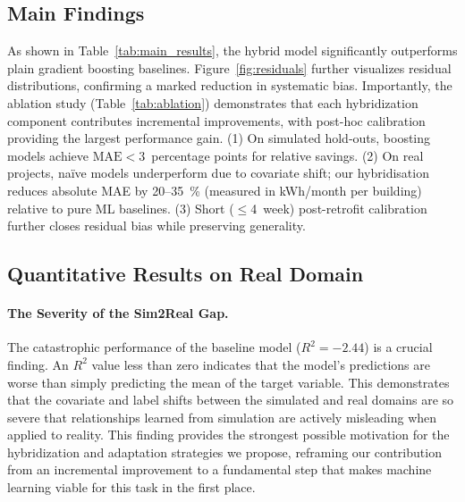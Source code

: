 ﻿\documentclass{article}
\begin{document}
\subsection{Main Findings}
As shown in Table~\ref{tab:main_results}, the hybrid model significantly outperforms 
plain gradient boosting baselines. Figure~\ref{fig:residuals} further visualizes 
residual distributions, confirming a marked reduction in systematic bias. 
Importantly, the ablation study (Table~\ref{tab:ablation}) 
demonstrates that each hybridization component contributes incremental improvements, 
with post-hoc calibration providing the largest performance gain.
(1) On simulated hold‑outs, boosting models achieve $\mathrm{MAE}<3$~percentage points for relative savings.
(2) On real projects, na\"ive models underperform due to covariate shift;
our hybridisation reduces absolute MAE by 20--35~\% (measured in kWh/month per building) relative to pure ML baselines.
(3) Short (\mbox{$\leq$4~week}) post-retrofit calibration further closes residual bias while preserving generality.
\subsection{Quantitative Results on Real Domain}
\paragraph{The Severity of the Sim2Real Gap.} The catastrophic performance of the baseline model ($R^2 = -2.44$) is a crucial finding. An $R^2$ value less than zero indicates that the model's predictions are worse than simply predicting the mean of the target variable. This demonstrates that the covariate and label shifts between the simulated and real domains are so severe that relationships learned from simulation are actively misleading when applied to reality. This finding provides the strongest possible motivation for the hybridization and adaptation strategies we propose, reframing our contribution from an incremental improvement to a fundamental step that makes machine learning viable for this task in the first place.
\end{document}
